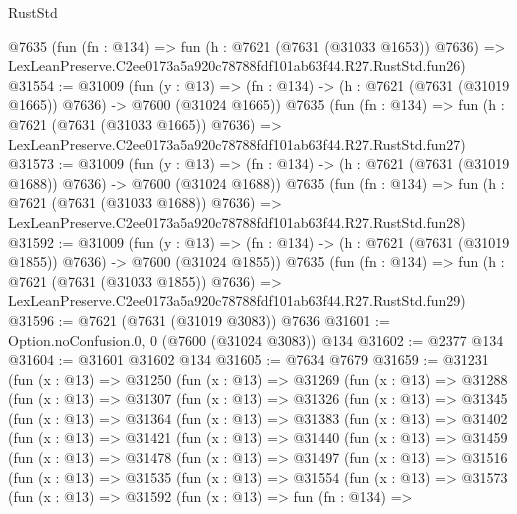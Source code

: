 \begin{lexlean}{RustStd}
\begin{coremodule}
    @7635
    (fun (fn : @134) =>
    fun (h : @7621 (@7631 (@31033 @1653)) @7636) =>
    LexLeanPreserve.C2ee0173a5a920c78788fdf101ab63f44.R27.RustStd.fun26)
@31554 := @31009
    (fun (y : @13) =>
    (fn : @134) -> (h : @7621 (@7631 (@31019 @1665)) @7636) -> @7600 (@31024 @1665))
    @7635
    (fun (fn : @134) =>
    fun (h : @7621 (@7631 (@31033 @1665)) @7636) =>
    LexLeanPreserve.C2ee0173a5a920c78788fdf101ab63f44.R27.RustStd.fun27)
@31573 := @31009
    (fun (y : @13) =>
    (fn : @134) -> (h : @7621 (@7631 (@31019 @1688)) @7636) -> @7600 (@31024 @1688))
    @7635
    (fun (fn : @134) =>
    fun (h : @7621 (@7631 (@31033 @1688)) @7636) =>
    LexLeanPreserve.C2ee0173a5a920c78788fdf101ab63f44.R27.RustStd.fun28)
@31592 := @31009
    (fun (y : @13) =>
    (fn : @134) -> (h : @7621 (@7631 (@31019 @1855)) @7636) -> @7600 (@31024 @1855))
    @7635
    (fun (fn : @134) =>
    fun (h : @7621 (@7631 (@31033 @1855)) @7636) =>
    LexLeanPreserve.C2ee0173a5a920c78788fdf101ab63f44.R27.RustStd.fun29)
@31596 := @7621 (@7631 (@31019 @3083)) @7636
@31601 := Option.noConfusion.{0, 0} (@7600 (@31024 @3083)) @134
@31602 := @2377 @134
@31604 := @31601 @31602 @134
@31605 := @7634 @7679
@31659 := @31231
    (fun (x : @13) =>
    @31250
      (fun (x : @13) =>
      @31269
        (fun (x : @13) =>
        @31288
          (fun (x : @13) =>
          @31307
            (fun (x : @13) =>
            @31326
              (fun (x : @13) =>
              @31345
                (fun (x : @13) =>
                @31364
                  (fun (x : @13) =>
                  @31383
                    (fun (x : @13) =>
                    @31402
                      (fun (x : @13) =>
                      @31421
                        (fun (x : @13) =>
                        @31440
                          (fun (x : @13) =>
                          @31459
                            (fun (x : @13) =>
                            @31478
                              (fun (x : @13) =>
                              @31497
                                (fun (x : @13) =>
                                @31516
                                  (fun (x : @13) =>
                                  @31535
                                    (fun (x : @13) =>
                                    @31554
                                      (fun (x : @13) =>
                                      @31573
                                        (fun (x : @13) =>
                                        @31592
                                          (fun (x : @13) =>
                                          fun (fn : @134) =>

\end{coremodule}
\end{lexlean}
